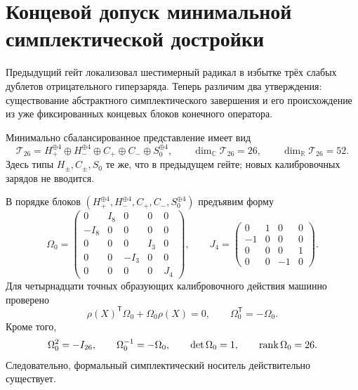 \chapter{Концевой допуск минимальной симплектической достройки}
\label{ch:v8-horizontal-phase-minimal-symplectic-completion-endpoint-admission-gate}

Предыдущий гейт локализовал шестимерный радикал в избытке трёх слабых
дублетов отрицательного гиперзаряда. Теперь различим два утверждения:
существование абстрактного симплектического завершения и его происхождение
из уже фиксированных концевых блоков конечного оператора.

Минимально сбалансированное представление имеет вид
\begin{equation}
 \mathcal T_{26}
 =H_+^{\oplus4}\oplus H_-^{\oplus4}
 \oplus C_+\oplus C_-\oplus S_0^{\oplus4},
 \qquad \dim_{\mathbb C}\mathcal T_{26}=26,
 \qquad \dim_{\mathbb R}\mathcal T_{26}=52.
 \label{eq:v8-minimal-symplectic-completion-decomposition}
\end{equation}
Здесь типы $H_\pm,C_\pm,S_0$ те же, что в предыдущем гейте; новых
калибровочных зарядов не вводится.

В порядке блоков
$(H_+^{\oplus4},H_-^{\oplus4},C_+,C_-,S_0^{\oplus4})$
предъявим форму
\begin{equation}
 \Omega_0=
 \begin{pmatrix}
  0&I_8&0&0&0\\
  -I_8&0&0&0&0\\
  0&0&0&I_3&0\\
  0&0&-I_3&0&0\\
  0&0&0&0&J_4
 \end{pmatrix},
 \qquad
 J_4=\begin{pmatrix}0&1&0&0\\-1&0&0&0\\0&0&0&1\\0&0&-1&0\end{pmatrix}.
 \label{eq:v8-minimal-symplectic-standard-form}
\end{equation}
Для четырнадцати точных образующих калибровочного действия машинно
проверено
\begin{equation}
 \rho(X)^{\mathsf T}\Omega_0+\Omega_0\rho(X)=0,
 \qquad \Omega_0^{\mathsf T}=-\Omega_0.
 \label{eq:v8-minimal-symplectic-gauge-invariance}
\end{equation}
Кроме того,
\begin{equation}
 \Omega_0^2=-I_{26},\qquad
 \Omega_0^{-1}=-\Omega_0,\qquad
 \det\Omega_0=1,\qquad \operatorname{rank}\Omega_0=26.
 \label{eq:v8-minimal-symplectic-nondegeneracy}
\end{equation}
Следовательно, формальный симплектический носитель действительно существует.

